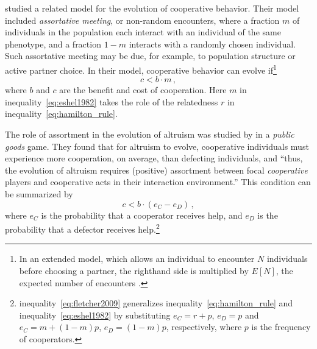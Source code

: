 \documentclass[12pt]{extarticle}
\begin{document}
\citet{Eshel1982} studied a related model for the evolution of cooperative behavior.
Their model included \emph{assortative meeting}, or non-random encounters, where a fraction $m$ of individuals in the population each interact with an individual of the same phenotype, and a fraction $1-m$ interacts  with a randomly chosen individual.  
Such assortative meeting may be due, for example, to population structure or active partner choice.
In their model, cooperative behavior can evolve if\footnote{In an extended model, which allows an individual to encounter $N$ individuals before choosing a partner, the righthand side is multiplied by $E[N]$, the expected number of encounters \citep[eq.~4.6]{Eshel1982}.
} 
\citep[eq.~3.2]{Eshel1982}
\begin{equation} \label{eq:eshel1982}
c < b \cdot m \,,
\end{equation}
where $b$ and $c$ are the benefit and cost of cooperation. 
Here $m$ in inequality~\ref{eq:eshel1982} takes the role of the relatedness $r$ in inequality~\ref{eq:hamilton_rule}.

The role of assortment in the evolution of altruism was studied by \citet{Fletcher2009assortment} in a \emph{public goods} game.
They found that for altruism to evolve, cooperative individuals must experience more cooperation, on average, than defecting individuals, and ``thus, the evolution of altruism requires (positive) assortment between focal \emph{cooperative} players and cooperative acts in their interaction environment.''
This condition can be summarized by \citep[eq.~2.3]{Fletcher2009assortment}
\begin{equation} \label{eq:fletcher2009}
c < b \cdot (e_C - e_D ) \,,
\end{equation}
where $e_C$ is the probability that a cooperator receives help, and $e_D$ is the probability that a defector receives help.\footnote{inequality~\ref{eq:fletcher2009} generalizes inequality~\ref{eq:hamilton_rule} and inequality~\ref{eq:eshel1982} by substituting $e_C=r + p$, $e_D=p$ and $e_C=m + (1-m)p$, $e_D=(1-m)p$, respectively, where $p$ is the frequency of cooperators.}
\end{document}
